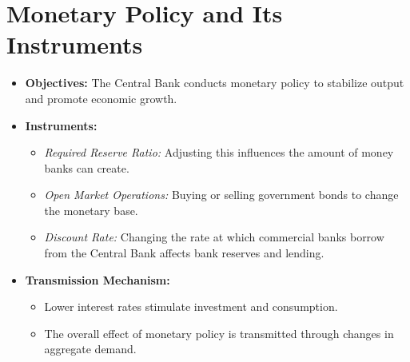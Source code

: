\section*{Monetary Policy and Its Instruments}
\begin{itemize}
    \item \textbf{Objectives:} The Central Bank conducts monetary policy to stabilize output and promote economic growth.
    \item \textbf{Instruments:}
    \begin{itemize}
        \item \emph{Required Reserve Ratio:} Adjusting this influences the amount of money banks can create.
        \item \emph{Open Market Operations:} Buying or selling government bonds to change the monetary base.
        \item \emph{Discount Rate:} Changing the rate at which commercial banks borrow from the Central Bank affects bank reserves and lending.
    \end{itemize}
    \item \textbf{Transmission Mechanism:}
    \begin{itemize}
        \item Lower interest rates stimulate investment and consumption.
        \item The overall effect of monetary policy is transmitted through changes in aggregate demand.
    \end{itemize}
\end{itemize}